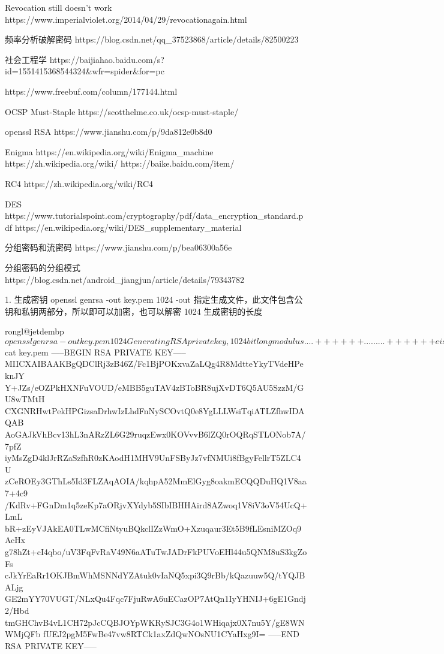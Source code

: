 
Revocation still doesn't work
https://www.imperialviolet.org/2014/04/29/revocationagain.html

频率分析破解密码
https://blog.csdn.net/qq_37523868/article/details/82500223

社会工程学
https://baijiahao.baidu.com/s?id=1551415368544324&wfr=spider&for=pc


https://www.freebuf.com/column/177144.html


OCSP Must-Staple
https://scotthelme.co.uk/ocsp-must-staple/


openssl RSA
https://www.jianshu.com/p/9da812e0b8d0

Enigma
https://en.wikipedia.org/wiki/Enigma_machine
https://zh.wikipedia.org/wiki/%
https://baike.baidu.com/item/%

RC4
https://zh.wikipedia.org/wiki/RC4

DES
https://www.tutorialspoint.com/cryptography/pdf/data_encryption_standard.pdf
https://en.wikipedia.org/wiki/DES_supplementary_material

分组密码和流密码
https://www.jianshu.com/p/bea06300a56e

分组密码的分组模式
https://blog.csdn.net/android_jiangjun/article/details/79343782


1. 生成密钥
openssl genrsa -out key.pem 1024
    -out 指定生成文件，此文件包含公钥和私钥两部分，所以即可以加密，也可以解密
    1024 生成密钥的长度

    rongl@jetdembp ~ $ openssl genrsa -out key.pem 1024
    Generating RSA private key, 1024 bit long modulus
    ....++++++
    .........++++++
    e is 65537 (0x10001)
    rongl@jetdembp ~ $ cat key.pem
    -----BEGIN RSA PRIVATE KEY-----
    MIICXAIBAAKBgQDClRj3zB46Z/Fc1BjPOKxvaZaLQg4R8MdtteYkyTVdeHPeknJY
    Y+JZs/eOZPkHXNFuVOUD/eMBB5guTAV4zBToBR8ujXvDT6Q5AU5SzzM/GU8wTMtH
    CXGNRHwtPekHPGizsaDrhwIzLhdFnNySCOvtQ0e8YgLLLWsiTqiATLZfhwIDAQAB
    AoGAJkVhBcv13hL3nARzZL6G29ruqzEwx0KOVvvB6lZQ0rOQRqSTLONob7A/7pfZ
    iyMsZgD4klJrRZaSzfhR0zKAodH1MHV9UnFSByJz7vfNMUi8fBgyFellrT5ZLC4U
    zCeROEy3GThLs5Id3FLZAqAOIA/kqhpA52MmElGyg8oakmECQQDuHQ1V8aa7+4c9
    /KdRv+FGnDm1q5zeKp7aORjvXYdyb5SIbIBHHAird8AZwoq1V8iV3oV54UcQ+LmL
    bR+zEyVJAkEA0TLwMCfiNtyuBQkclIZzWmO+Xzuqaur3Et5B9fLEsniMZOq9AcHx
    g78hZt+cI4qbo/uV3FqFvRaV49N6aATuTwJADrFkPUVoEHl44u5QNM8uS3kgZoFs
    cJkYrEaRr1OKJBmWhMSNNdYZAtuk0vIaNQ5xpi3Q9rBb/kQazuuw5Q/tYQJBALjg
    GE2mYY70VUGT/NLxQu4Fqc7FjuRwA6uECazOP7AtQn1IyYHNIJ+6gE1Gndj2/Hbd
    tmGHChvB4vL1CH72pJcCQBJOYpWKRySJC3G4o1WHiqajx0X7nu5Y/gE8WNWMjQFb
    fUEJ2pgM5FwBe47vw8RTCk1axZdQwNOsNU1CYaHxg9I=
    -----END RSA PRIVATE KEY-----


